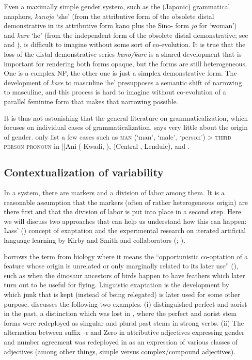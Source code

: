 \documentclass[output=collectionpaper]{langsci/langscibook}
\begin{document}
Even a maximally simple gender system, such as the  (Japonic) grammatical anaphors, \textit{kanojo} `she' (from the attributive form of the obsolete distal demonstrative in its attributive form kano plus the Sino- form \textit{jo} for `woman') and \textit{kare} `he' (from the independent form of the obsolete distal demonstrative; see \citealt{Ishiyama2008} and ), is difficult to imagine without some sort of co-evolution. It is true that the loss of the distal demonstrative series \textit{kano/kare} is a shared development that is important for rendering both forms opaque, but the forms are still heterogeneous. One is a complex NP, the other one is just a simplex demonstrative form. The development of \textit{kare} to masculine `he' presupposes a semantic shift of narrowing to masculine, and this process is hard to imagine without co-evolution of a parallel feminine form that makes that narrowing possible.

It is thus not astonishing that the general literature on grammaticalization, which focuses on individual cases of grammaticalization, says very little about the origin of gender. \cite{Heine2002} only list a few cases such as \textsc{man} (`man', `male', `person') > \textsc{third person pronoun} in ||Ani (-Kwadi, ),  (Central , Lenduic), and .


  \subsection{Contextualization of variability}
  \label{sec:WDG:10.3}

In a system, there are markers and a division of labor among them. It is a reasonable assumption that the markers (often of rather heterogeneous origin) are there first and that the division of labor is put into place in a second step. Here we will discuss two approaches that can help us understand how this can happen: Lass' (\citealt*{Lass1990}) concept of exaptation and the experimental research on iterated artificial language learning by Kirby and Smith and collaborators (\citealt{Kirby2008}; \citealt{Smith2010}).

\cite{Lass1990} borrows the term  from biology where it means the ``opportunistic co-optation of a feature whose origin is unrelated or only marginally related to its later use'' (\citealt[80]{Lass1990}), such as when the dinosaur ancestors of birds happen to have feathers which later turn out to be useful for flying. Linguistic exaptation is the development by which junk that is kept (instead of being relegated) is later used for some other purpose. \cite{Lass1990} discusses the following two examples. (i)  distinguished perfect and aorist in the past, a distinction which was lost in , where the perfect and aorist stem forms were redeployed as singular and plural past stems in strong verbs. (ii) The  alternation between suffix \textit{-e} and Zero in attributive adjectives expressing gender and number agreement was redeployed in  as an expression of various classes of adjectives (among other things, simple versus complex/compound adjectives).
\end{document}
